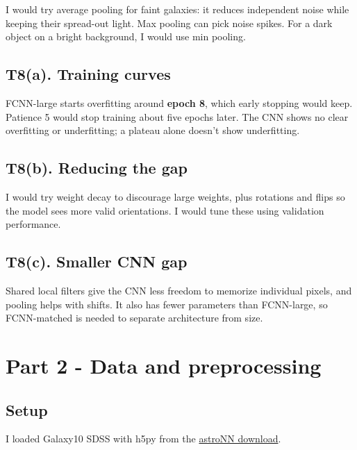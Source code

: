 \documentclass[11pt,a4paper]{article}
\begin{document}
I would try average pooling for faint galaxies: it reduces independent noise while keeping their spread-out light. Max pooling can pick noise spikes. For a dark object on a bright background, I would use min pooling.


\subsection*{T8(a). Training curves}

FCNN-large starts overfitting around \textbf{epoch 8}, which early stopping would keep. Patience 5 would stop training about five epochs later. The CNN shows no clear overfitting or underfitting; a plateau alone doesn't show underfitting.


\subsection*{T8(b). Reducing the gap}

I would try weight decay to discourage large weights, plus rotations and flips so the model sees more valid orientations. I would tune these using validation performance.


\subsection*{T8(c). Smaller CNN gap}

Shared local filters give the CNN less freedom to memorize individual pixels, and pooling helps with shifts. It also has fewer parameters than FCNN-large, so FCNN-matched is needed to separate architecture from size.


\section*{Part 2 - Data and preprocessing}




\subsection*{Setup}

I loaded Galaxy10 SDSS with h5py from the \href{https://astronn.readthedocs.io/en/latest/galaxy10sdss.html}{astroNN download}.
\end{document}
